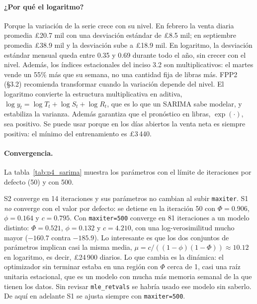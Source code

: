 \paragraph{¿Por qué el logaritmo?} Porque la variación de la serie crece con
su nivel. En febrero la venta diaria promedia \pounds20.7 mil con una
desviación estándar de \pounds8.5 mil; en septiembre promedia \pounds38.9 mil
y la desviación sube a \pounds18.9 mil. En logaritmo, la desviación estándar
mensual queda entre 0.35 y 0.69 durante todo el año, sin crecer con el
nivel. Además, los índices
estacionales del inciso 3.2 son multiplicativos: el martes vende un 55\% más
que su semana, no una cantidad fija de libras más. FPP2 (§3.2) recomienda
transformar cuando la variación depende del nivel. El logaritmo convierte la
estructura multiplicativa en aditiva, $\log y_t = \log T_t + \log S_t + \log
R_t$, que es lo que un SARIMA sabe modelar, y estabiliza la varianza. Además
garantiza que el pronóstico en libras, $\exp(\cdot)$, sea positivo. Se puede
usar porque en los días abiertos la venta neta es siempre positiva: el mínimo
del entrenamiento es \pounds3\,440.

\paragraph{Convergencia.} La tabla~\ref{tab:p4_sarima} muestra los
parámetros con el límite de iteraciones por defecto (50) y con 500.

\begin{table}[H]
  \centering
  \small
  \caption{Parámetros de S1 y S2 sobre $\log y_t$ con 50 y 500 iteraciones
  como máximo. ``Convergió'' es \texttt{mle\_retvals['converged']}.}
  \label{tab:p4_sarima}
\end{table}

S2 converge en 14 iteraciones y sus parámetros no cambian al subir
\texttt{maxiter}. S1 \emph{no} converge con el valor por defecto: se detiene en
la iteración 50 con $\Phi=0.906$, $\phi=0.164$ y $c=0.795$. Con
\texttt{maxiter=500} converge en 81 iteraciones a un modelo distinto:
$\Phi=0.521$, $\phi=0.132$ y $c=4.210$, con una log-verosimilitud mucho
mayor ($-160.7$ contra $-185.9$). Lo interesante es que los dos conjuntos de
parámetros implican casi la misma media, $\mu=c/((1-\phi)(1-\Phi))\approx
10.12$ en logaritmo, es decir, \pounds24\,900 diarios. Lo que cambia es la
dinámica: el optimizador sin terminar estaba en una región con $\Phi$ cerca
de 1, casi una raíz unitaria estacional, que es un modelo con mucha más
memoria semanal de la que tienen los datos. Sin revisar
\texttt{mle\_retvals} se habría usado ese modelo sin saberlo. De aquí en
adelante S1 se ajusta siempre con \texttt{maxiter=500}.

